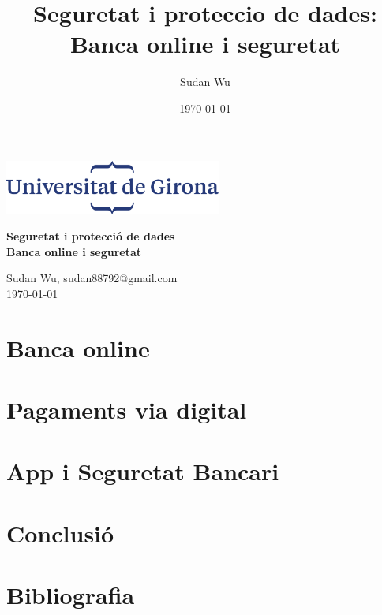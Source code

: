 \documentclass[12pt,a4paper]{article}
\title{Seguretat i proteccio de dades: Banca online i seguretat}
\author{Sudan Wu}
\date{\today}
\begin{document}
\begin{titlepage}
    \begin{center}
        \includegraphics[height=1.8cm]{logoUdG}\\\vfill
    \end{center}
    \center
    {\huge \bfseries Seguretat i protecció de dades}\\[0.5cm]
    {\Huge \bfseries Banca online i seguretat} \\
    \vfill
    \begin{center} \large
        {Sudan Wu, sudan88792@gmail.com} \\[0.25cm]
        {\today}\\ [1cm]
    \end{center}

\end{titlepage}

\tableofcontents


\clearpage
\section{Banca online}

\clearpage

\clearpage
\section{Pagaments via digital}



\section{App i Seguretat Bancari}

\clearpage

\section{Conclusió}

\clearpage

\clearpage
\section{Bibliografia}

\end{document}

